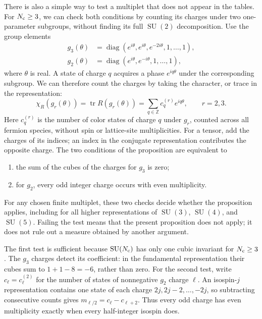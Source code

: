 \documentclass[11pt,a4paper]{article}
\theoremstyle{remark}
\DeclareMathOperator{\tr}{tr}
\DeclareMathOperator{\SU}{SU}
\begin{document}
There is also a simple way to test a multiplet that does not appear in
the tables. For $N_{\rm c}\ge3$, we can check both conditions by counting
its charges under two one-parameter subgroups, without finding its full
$\SU(2)$ decomposition. Use the group elements
\begin{equation}
 \begin{split}
 g_3(\theta)&=\operatorname{diag}
 (e^{i\theta},e^{i\theta},e^{-2i\theta},1,\ldots,1),\\
 g_2(\theta)&=\operatorname{diag}
 (e^{i\theta},e^{-i\theta},1,\ldots,1),
 \end{split}
\end{equation}
where $\theta$ is real. A state of charge $q$ acquires a phase
$e^{iq\theta}$ under the corresponding subgroup. We can therefore count
the charges by taking the character, or trace in the representation:
\begin{equation}
 \chi_R(g_r(\theta))=\tr R(g_r(\theta))
 =\sum_{q\in\mathbb Z}c_q^{(r)}e^{iq\theta},\qquad r=2,3.
\end{equation}
Here $c_q^{(r)}$ is the number of color states of charge $q$ under
$g_r$, counted across all fermion species, without spin or lattice-site
multiplicities. For a tensor, add the charges of its indices; an index
in the conjugate representation contributes the opposite charge.
The two conditions of the proposition are equivalent to
\begin{enumerate}
\item the sum of the cubes of the charges for $g_3$ is zero;
\item for $g_2$, every odd integer charge occurs with even multiplicity.
\end{enumerate}
For any chosen finite multiplet, these two checks decide whether the
proposition applies, including for all higher representations of
$\SU(3)$, $\SU(4)$, and $\SU(5)$. Failing the test means that the
present proposition does not apply; it does not rule out a measure
obtained by another argument.

The first test is sufficient because $\SU(N_{\rm c})$ has only one
cubic invariant for $N_{\rm c}\ge3$. The $g_3$ charges detect its
coefficient: in the fundamental representation their cubes sum to
$1+1-8=-6$, rather than zero. For the second test, write
$c_\ell=c_\ell^{(2)}$ for the number of states of nonnegative
$g_2$ charge $\ell$. An isospin-$j$ representation contains one state
of each charge $2j,2j-2,\ldots,-2j$, so subtracting consecutive counts
gives $m_{\ell/2}=c_\ell-c_{\ell+2}$. Thus every odd charge has even
multiplicity exactly when every half-integer isospin does.
\end{document}
